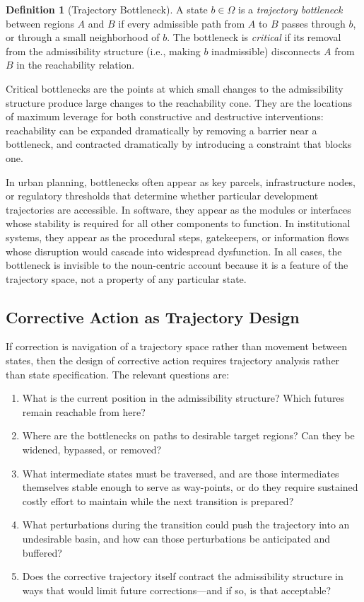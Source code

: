 \documentclass[12pt, a4paper]{article}
\theoremstyle{plain}
\theoremstyle{definition}
\newtheorem{definition}[theorem]{Definition}
\theoremstyle{remark}
\begin{document}
\begin{definition}[Trajectory Bottleneck]
A state $b \in \Omega$ is a \emph{trajectory bottleneck} between regions
$A$ and $B$ if every admissible path from $A$ to $B$ passes through $b$,
or through a small neighborhood of $b$. The bottleneck is \emph{critical}
if its removal from the admissibility structure (i.e., making $b$ inadmissible)
disconnects $A$ from $B$ in the reachability relation.
\end{definition}

Critical bottlenecks are the points at which small changes to the
admissibility structure produce large changes to the reachability cone.
They are the locations of maximum leverage for both constructive and
destructive interventions: reachability can be expanded dramatically by
removing a barrier near a bottleneck, and contracted dramatically by
introducing a constraint that blocks one.

In urban planning, bottlenecks often appear as key parcels, infrastructure
nodes, or regulatory thresholds that determine whether particular development
trajectories are accessible. In software, they appear as the modules or
interfaces whose stability is required for all other components to function.
In institutional systems, they appear as the procedural steps, gatekeepers,
or information flows whose disruption would cascade into widespread
dysfunction. In all cases, the bottleneck is invisible to the noun-centric
account because it is a feature of the trajectory space, not a property of
any particular state.

\subsection{Corrective Action as Trajectory Design}

If correction is navigation of a trajectory space rather than movement
between states, then the design of corrective action requires trajectory
analysis rather than state specification. The relevant questions are:

\begin{enumerate}[leftmargin=*, label=(\roman*)]
\item What is the current position in the admissibility structure? Which
futures remain reachable from here?
\item Where are the bottlenecks on paths to desirable target regions?
Can they be widened, bypassed, or removed?
\item What intermediate states must be traversed, and are those intermediates
themselves stable enough to serve as way-points, or do they require sustained
costly effort to maintain while the next transition is prepared?
\item What perturbations during the transition could push the trajectory
into an undesirable basin, and how can those perturbations be anticipated
and buffered?
\item Does the corrective trajectory itself contract the admissibility
structure in ways that would limit future corrections---and if so, is that
acceptable?
\end{enumerate}
\end{document}

